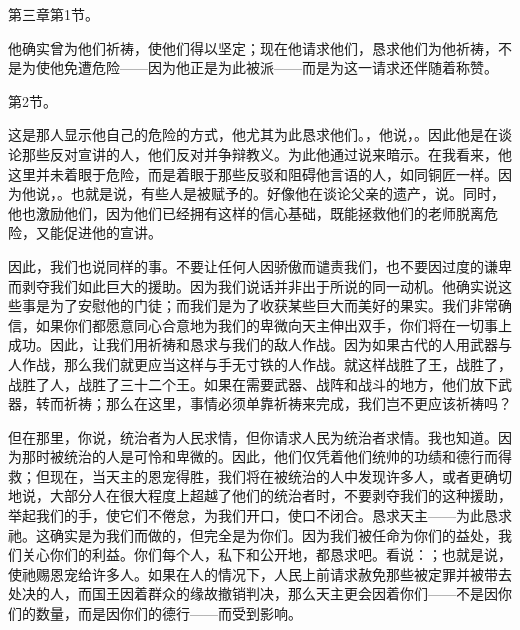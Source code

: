 第三章第1节。\par

他确实曾为他们祈祷，使他们得以坚定；现在他请求他们，恳求他们为他祈祷，不是为使他免遭危险——因为他正是为此被派——而是为这一请求还伴随着称赞。\par

第2节。\par

这是那人显示他自己的危险的方式，他尤其为此恳求他们。，他说，。因此他是在谈论那些反对宣讲的人，他们反对并争辩教义。为此他通过说来暗示。在我看来，他这里并未着眼于危险，而是着眼于那些反驳和阻碍他言语的人，如同铜匠一样。因为他说，。也就是说，有些人是被赋予的。好像他在谈论父亲的遗产，说。同时，他也激励他们，因为他们已经拥有这样的信心基础，既能拯救他们的老师脱离危险，又能促进他的宣讲。\par

因此，我们也说同样的事。不要让任何人因骄傲而谴责我们，也不要因过度的谦卑而剥夺我们如此巨大的援助。因为我们说话并非出于所说的同一动机。他确实说这些事是为了安慰他的门徒；而我们是为了收获某些巨大而美好的果实。我们非常确信，如果你们都愿意同心合意地为我们的卑微向天主伸出双手，你们将在一切事上成功。因此，让我们用祈祷和恳求与我们的敌人作战。因为如果古代的人用武器与人作战，那么我们就更应当这样与手无寸铁的人作战。就这样战胜了王，战胜了，战胜了人，战胜了三十二个王。如果在需要武器、战阵和战斗的地方，他们放下武器，转而祈祷；那么在这里，事情必须单靠祈祷来完成，我们岂不更应该祈祷吗？\par

但在那里，你说，统治者为人民求情，但你请求人民为统治者求情。我也知道。因为那时被统治的人是可怜和卑微的。因此，他们仅凭着他们统帅的功绩和德行而得救；但现在，当天主的恩宠得胜，我们将在被统治的人中发现许多人，或者更确切地说，大部分人在很大程度上超越了他们的统治者时，不要剥夺我们的这种援助，举起我们的手，使它们不倦怠，为我们开口，使口不闭合。恳求天主——为此恳求祂。这确实是为我们而做的，但完全是为你们。因为我们被任命为你们的益处，我们关心你们的利益。你们每个人，私下和公开地，都恳求吧。看说：；也就是说，使祂赐恩宠给许多人。如果在人的情况下，人民上前请求赦免那些被定罪并被带去处决的人，而国王因着群众的缘故撤销判决，那么天主更会因着你们——不是因你们的数量，而是因你们的德行——而受到影响。\par

